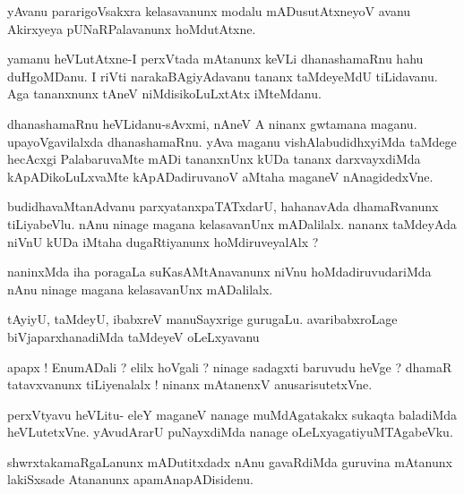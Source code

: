 \documentclass{article}
\begin{document}
\begin{mn}%
yAvanu pararigoVsakxra kelasavanunx modalu mADusutAtxneyoV avanu Akirxyeya pUNaRPalavanunx 
hoMdutAtxne.
\end{mn}

\begin{mn}%
yamanu heVLutAtxne-I perxVtada mAtanunx keVLi dhanashamaRnu hahu duHgoMDanu. I riVti 
narakaBAgiyAdavanu tananx taMdeyeMdU tiLidavanu. Aga tananxnunx tAneV niMdisikoLuLxtAtx 
iMteMdanu.
\end{mn}

\begin{mn}%
dhanashamaRnu heVLidanu-sAvxmi, nAneV A ninanx gwtamana maganu. upayoVgavilalxda 
dhanashamaRnu. yAva maganu vishAlabudidhxyiMda taMdege hecAcxgi PalabaruvaMte mADi 
tananxnUnx kUDa tananx darxvayxdiMda kApADikoLuLxvaMte kApADadiruvanoV aMtaha maganeV 
nAnagidedxVne.
\end{mn}

\begin{mn}%
budidhavaMtanAdvanu parxyatanxpaTATxdarU, hahanavAda dhamaRvanunx tiLiyabeVlu. nAnu ninage 
magana kelasavanUnx mADalilalx. nananx taMdeyAda niVnU kUDa iMtaha dugaRtiyanunx 
hoMdiruveyalAlx ?
\end{mn}

\begin{mn}%
naninxMda iha poragaLa suKasAMtAnavanunx niVnu hoMdadiruvudariMda nAnu ninage magana 
kelasavanUnx mADalilalx.
\end{mn}

\begin{mn}%
tAyiyU, taMdeyU, ibabxreV manuSayxrige gurugaLu. avaribabxroLage biVjaparxhanadiMda 
taMdeyeV oLeLxyavanu
\end{mn}

\begin{mn}%
apapx ! EnumADali ? elilx hoVgali ? ninage sadagxti baruvudu heVge ? dhamaR tatavxvanunx 
tiLiyenalalx ! ninanx mAtanenxV anusarisutetxVne.
\end{mn}

\begin{mn}%
perxVtyavu  heVLitu- eleY maganeV nanage muMdAgatakakx sukaqta baladiMda heVLutetxVne. 
yAvudArarU puNayxdiMda nanage oLeLxyagatiyuMTAgabeVku.
\end{mn}

\begin{mn}%
shwrxtakamaRgaLanunx mADutitxdadx nAnu gavaRdiMda guruvina mAtanunx lakiSxsade Atananunx 
apamAnapADisidenu.
\end{mn}
\end{document}
